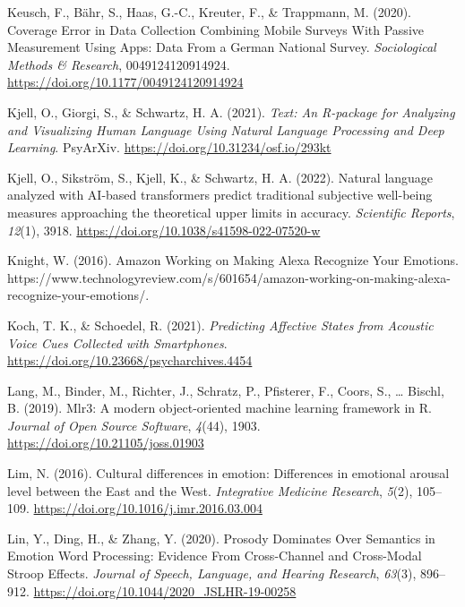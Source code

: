 \documentclass[
  man,floatsintext]{apa6}
\newlength{\cslhangindent}
\newlength{\cslentryspacingunit} %
\newenvironment{CSLReferences}[2] %
 {%
  \setlength{\parindent}{0pt}
  \ifodd #1
  \let\oldpar\par
  \def\par{\hangindent=\cslhangindent\oldpar}
  \fi
  \setlength{\parskip}{#2\cslentryspacingunit}
 }%
 {}
\begin{document}
\begin{CSLReferences}{1}{0}
\leavevmode{}%
Keusch, F., Bähr, S., Haas, G.-C., Kreuter, F., \& Trappmann, M. (2020). Coverage {Error} in {Data Collection Combining Mobile Surveys With Passive Measurement Using Apps}: {Data From} a {German National Survey}. \emph{Sociological Methods \& Research}, 0049124120914924. \url{https://doi.org/10.1177/0049124120914924}

\leavevmode{}%
Kjell, O., Giorgi, S., \& Schwartz, H. A. (2021). \emph{Text: {An R-package} for {Analyzing} and {Visualizing Human Language Using Natural Language Processing} and {Deep Learning}}. {PsyArXiv}. \url{https://doi.org/10.31234/osf.io/293kt}

\leavevmode{}%
Kjell, O., Sikström, S., Kjell, K., \& Schwartz, H. A. (2022). Natural language analyzed with {AI-based} transformers predict traditional subjective well-being measures approaching the theoretical upper limits in accuracy. \emph{Scientific Reports}, \emph{12}(1), 3918. \url{https://doi.org/10.1038/s41598-022-07520-w}

\leavevmode{}%
Knight, W. (2016). Amazon {Working} on {Making Alexa Recognize Your Emotions}. https://www.technologyreview.com/s/601654/amazon-working-on-making-alexa-recognize-your-emotions/.

\leavevmode{}%
Koch, T. K., \& Schoedel, R. (2021). \emph{Predicting {Affective States} from {Acoustic Voice Cues Collected} with {Smartphones}}. \url{https://doi.org/10.23668/psycharchives.4454}

\leavevmode{}%
Lang, M., Binder, M., Richter, J., Schratz, P., Pfisterer, F., Coors, S., \ldots{} Bischl, B. (2019). Mlr3: {A} modern object-oriented machine learning framework in {R}. \emph{Journal of Open Source Software}, \emph{4}(44), 1903. \url{https://doi.org/10.21105/joss.01903}

\leavevmode{}%
Lim, N. (2016). Cultural differences in emotion: Differences in emotional arousal level between the {East} and the {West}. \emph{Integrative Medicine Research}, \emph{5}(2), 105--109. \url{https://doi.org/10.1016/j.imr.2016.03.004}

\leavevmode{}%
Lin, Y., Ding, H., \& Zhang, Y. (2020). Prosody {Dominates Over Semantics} in {Emotion Word Processing}: {Evidence From Cross-Channel} and {Cross-Modal Stroop Effects}. \emph{Journal of Speech, Language, and Hearing Research}, \emph{63}(3), 896--912. \url{https://doi.org/10.1044/2020_JSLHR-19-00258}


\end{CSLReferences}
\end{document}
